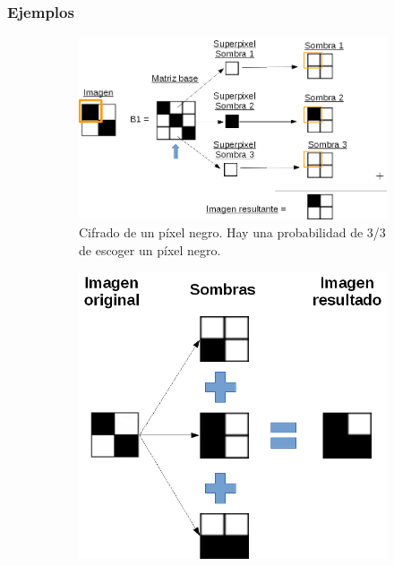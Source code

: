 \subsubsection{Ejemplos}
\begin{figure}[ht]
	\centering
	\begin{subfigure}[t]{0.6\textwidth}
		\centering
		\includegraphics[width=\textwidth]{images/PVCSnegro}
		\caption{Cifrado de un píxel negro. Hay una probabilidad de 3/3
		de escoger un píxel negro.}
		\label{fig:cifradoPVCSn}
	\end{subfigure}
	\hspace{0.5cm}
	\begin{subfigure}[t]{0.3\textwidth}
		\centering
		\includegraphics[width=\textwidth]{images/PVCSfallo}

\end{subfigure}
\end{figure}
